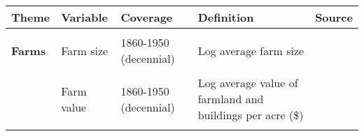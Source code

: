 \begin{tabular}{@{}l|llll@{}}
\hline\hline
\textbf{Theme}                     & \textbf{Variable}                                           & \textbf{Coverage}                     & \textbf{Definition}     & \textbf{Source}                            											     \\
\hline
                                   &                                                             &                                    &             &                                                                                                                                                                                                   \\                                                            
\textbf{Farms} 	      & Farm size          & 1860-1950 (decennial)                        & Log average farm size           & \citet{haines2010}                                                                                                                                                    \\                               
                                     &                                                             &                            &               &            \\     
		&  Farm value                                               &  1860-1950 (decennial)                          & Log average value of farmland and buildings per acre (\$)          & \citet{haines2010}             \\    
                                   &                                                             &                                 &             &                                                                                                                                                                                                   \\                                           

\end{tabular}
